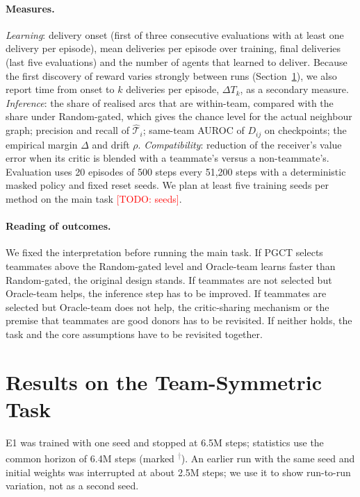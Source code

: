 \documentclass{article}
\theoremstyle{remark}
\newcommand{\todo}[1]{\textcolor{red}{[TODO: #1]}}
\newcommand{\pilot}{\textsuperscript{\textcolor{gray}{$\dagger$}}}
\newcommand{\ours}{PGCT}
\begin{document}
\paragraph{Measures.} \emph{Learning}: delivery onset (first of three consecutive evaluations with at least one delivery per
episode), mean deliveries per episode over training, final deliveries (last five evaluations) and the number of agents that
learned to deliver. Because the first discovery of reward varies strongly between runs (Section~\ref{sec:e1}), we also report
time from onset to $k$ deliveries per episode, $\Delta T_k$, as a secondary measure. \emph{Inference}: the share of realised
arcs that are within-team, compared with the share under Random-gated, which gives the chance level for the actual neighbour
graph; precision and recall of $\hat{\mathcal{T}}_i$; same-team AUROC of $D_{ij}$ on checkpoints; the empirical margin $\Delta$
and drift $\rho$. \emph{Compatibility}: reduction of the receiver's value error when its critic is blended with a teammate's
versus a non-teammate's. Evaluation uses 20 episodes of 500 steps every 51{,}200 steps with a deterministic masked policy and
fixed reset seeds. We plan at least five training seeds per method on the main task \todo{seeds}.

\paragraph{Reading of outcomes.} We fixed the interpretation before running the main task. If \ours{} selects teammates above
the Random-gated level and Oracle-team learns faster than Random-gated, the original design stands. If teammates are not
selected but Oracle-team helps, the inference step has to be improved. If teammates are selected but Oracle-team does not help,
the critic-sharing mechanism or the premise that teammates are good donors has to be revisited. If neither holds, the task and
the core assumptions have to be revisited together.

\section{Results on the Team-Symmetric Task}
\label{sec:e1}
E1 was trained with one seed and stopped at 6.5M steps; statistics use the common horizon of 6.4M steps (marked \pilot).
An earlier run with the same seed and initial weights was interrupted at about 2.5M steps; we use it to show run-to-run
variation, not as a second seed.
\end{document}
